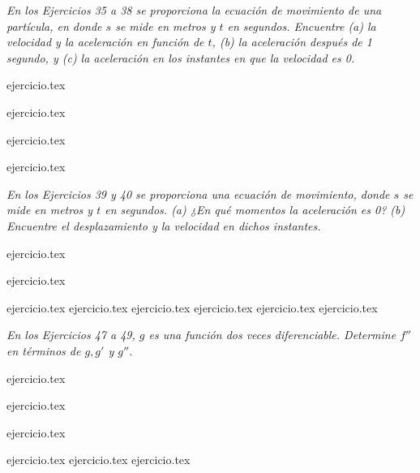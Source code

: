 \noindent \textit{En los Ejercicios 35 a 38 se proporciona la ecuación de movimiento de una partícula, en donde $s$ se mide en metros y $t$ en segundos. Encuentre (a) la velocidad y la aceleración en función de $t$, (b) la aceleración después de 1 segundo, y (c) la aceleración en los instantes en que la velocidad es 0.}

\begin{enumerate}
    \begin{minipage}{0.45\textwidth}
    \setcounter{enumi}{34}
    {ejercicio.tex}
    \addtocounter{enumi}{1}
    {ejercicio.tex}
    \end{minipage}%
    \begin{minipage}{0.45\textwidth}
    \setcounter{enumi}{35}
    {ejercicio.tex}
    \addtocounter{enumi}{1}
    {ejercicio.tex}
    \end{minipage}
\end{enumerate}

\noindent \textit{En los Ejercicios 39 y 40 se proporciona una ecuación de movimiento, donde $s$ se mide en metros y $t$ en segundos. (a) ¿En qué momentos la aceleración es 0? (b) Encuentre el desplazamiento y la velocidad en dichos instantes.}

\begin{enumerate}
    \begin{minipage}{0.45\textwidth}
    \setcounter{enumi}{38}
    {ejercicio.tex}
    \end{minipage}%
    \begin{minipage}{0.45\textwidth}
    \setcounter{enumi}{39}
    {ejercicio.tex}
    \end{minipage}
\end{enumerate}

\begin{enumerate}
    \setcounter{enumi}{40}
    {ejercicio.tex}
    {ejercicio.tex}
    {ejercicio.tex}
    {ejercicio.tex}
    {ejercicio.tex}
    {ejercicio.tex}
\end{enumerate}

\noindent \textit{En los Ejercicios 47 a 49, $g$ es una función dos veces diferenciable. Determine $f''$ en términos de $g, g'$ y $g''$.}

\begin{enumerate}
    \begin{minipage}{0.45\textwidth}
    \setcounter{enumi}{46}
    {ejercicio.tex}
    \addtocounter{enumi}{1}
    {ejercicio.tex}
    \end{minipage}%
    \begin{minipage}{0.45\textwidth}
    \setcounter{enumi}{47}
    {ejercicio.tex}
    \end{minipage}
\end{enumerate}

\begin{enumerate}
    \setcounter{enumi}{49}
    {ejercicio.tex}
    {ejercicio.tex}
    {ejercicio.tex}
\end{enumerate}
